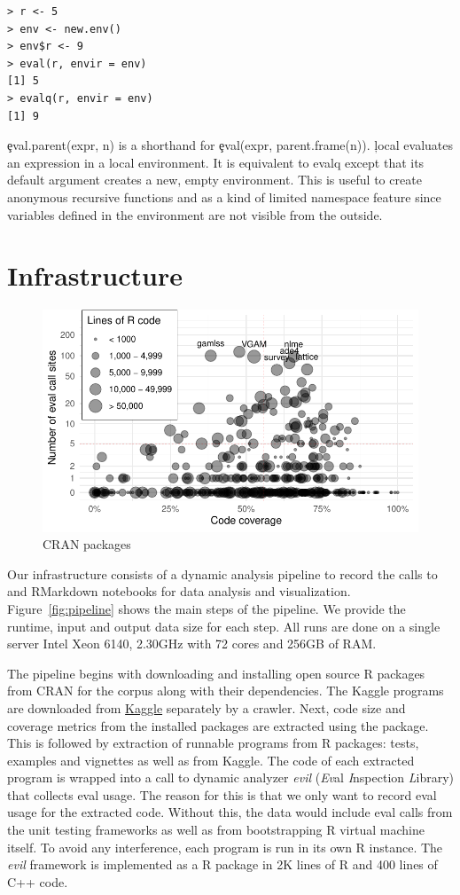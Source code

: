 \documentclass[conference]{IEEEtran}
\begin{document}
\begin{lstlisting}
> r <- 5
> env <- new.env()
> env$r <- 9
> eval(r, envir = env)
[1] 5
> evalq(r, envir = env)
[1] 9
\end{lstlisting}

\c{eval.parent(expr, n)} is a shorthand for \c{eval(expr, parent.frame(n))}.
\c{local} evaluates an expression in a local environment. It is equivalent
to evalq except that its default argument creates a new, empty
environment. This is useful to create anonymous recursive functions and as a
kind of limited namespace feature since variables defined in the environment
are not visible from the outside.


\section{Infrastructure}


\begin{figure}[!tb]\centering\includegraphics[width=.8\linewidth]
  {corpus.pdf}\caption{CRAN packages}\label{fig:corpus}
\end{figure}

Our infrastructure consists of a dynamic analysis pipeline to record the
calls to \eval and RMarkdown notebooks for data analysis and visualization.
Figure~\ref{fig:pipeline} shows the main steps of the pipeline. We provide
the runtime, input and output data size for each step. All runs are done on
a single server Intel Xeon 6140, 2.30GHz with 72 cores and 256GB of RAM.

The pipeline begins with downloading and installing open source R packages
from CRAN for the corpus along with their dependencies. The Kaggle programs
are downloaded from \href{http://www.kaggle.com}{Kaggle} separately by a
crawler.  Next, code size and coverage metrics from the installed packages
are extracted using the \href{ https://github.com/r-lib/covr}{\covr}
package. This is followed by extraction of runnable programs from R
packages: tests, examples and vignettes as well as from Kaggle. The code of
each extracted program is wrapped into a call to dynamic analyzer
\emph{evil} (\emph{Ev}al \emph{I}nspection \emph{L}ibrary) that collects eval
usage. The reason for this is that we only want to record eval usage for the
extracted code. Without this, the data would include eval calls from the
unit testing frameworks as well as from bootstrapping R virtual machine
itself. To avoid any interference, each program is run in its own R
instance. The \emph{evil} framework is implemented as a R package in 2K lines of
R and 400 lines of C++ code.
\end{document}
